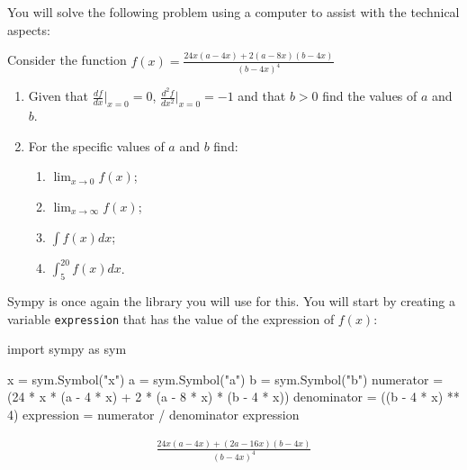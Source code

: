 You will solve the following problem using a computer to assist with the
technical aspects:

Consider the function \(f(x)= \frac{24 x \left(a - 4 x\right) + 2 \left(a - 8 x\right) \left(b - 4 x\right)}{\left(b - 4 x\right)^{4}}\)
\begin{enumerate}

\item 

Given that \(\frac{df}{dx}|_{x=0}=0\), \(\frac{d^2f}{dx^2}|_{x=0}=-1\) and that \(b>0\) find the values of \(a\) and \(b\).

\item 

For the specific values of \(a\) and \(b\) find:
\begin{enumerate}

\item 

\(\lim_{x\to 0}f(x)\);

\item 

\(\lim_{x\to \infty}f(x)\);

\item 

\(\int f(x) dx\);

\item 

\(\int_{5}^{20} f(x) dx\).

\end{enumerate}

\end{enumerate}



Sympy is once again the library you will use for this.
You will start by creating a variable \texttt{expression} that has the value of the expression of \(f(x)\):




\begin{pyin}
import sympy as sym

x = sym.Symbol("x")
a = sym.Symbol("a")
b = sym.Symbol("b")
numerator = (24 * x * (a - 4 * x) + 2 * (a - 8 * x) * (b - 4 * x))
denominator = ((b - 4 * x) ** 4)
expression = numerator / denominator
expression
\end{pyin}




\begin{equation*}
\begin{split}\displaystyle \frac{24 x \left(a - 4 x\right) + \left(2 a - 16 x\right) \left(b - 4 x\right)}{\left(b - 4 x\right)^{4}}\end{split}
\end{equation*}

